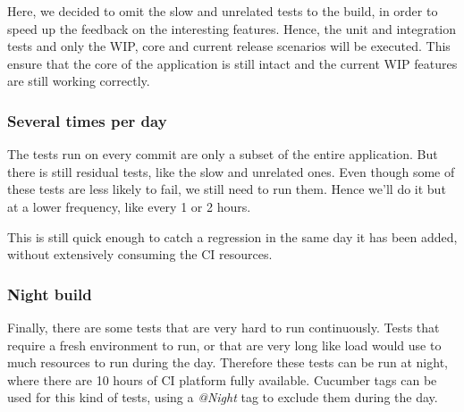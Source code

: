 Here, we decided to omit the slow and unrelated tests to the build, in order
to speed up the feedback on the interesting features.
Hence, the unit and integration tests and only the WIP, core and current
release scenarios will be executed.
This ensure that the core of the application is still intact and the current
WIP features are still working correctly.

\subsubsection{Several times per day}
The tests run on every commit are only a subset of the entire application.
But there is still residual tests, like the slow and unrelated ones.
Even though some of these tests are less likely to fail, we still need to run
them.
Hence we'll do it but at a lower frequency, like every 1 or 2 hours.

This is still quick enough to catch a regression in the same day it has been
added, without extensively consuming the CI resources.

\subsubsection{Night build}
Finally, there are some tests that are very hard to run continuously.
Tests that require a fresh environment to run, or that are very long like
load would use to much resources to run during the day.
Therefore these tests can be run at night, where there are 10 hours of CI
platform fully available.
Cucumber tags can be used for this kind of tests, using a \textit{@Night} tag
to exclude them during the day.
